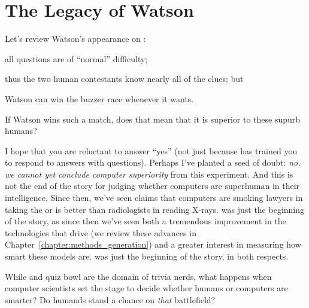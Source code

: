 
\section{The Legacy of Watson}


Let's review Watson's appearance on \jeopardy{}:
\begin{enumerate*}
        \item all questions are of ``normal'' difficulty;
        \item thus the two human contestants know nearly all of the clues; but
        \item Watson can win the buzzer race whenever it wants.
\end{enumerate*}
If Watson wins such a match, does that mean that it is superior to
these supurb humans?

I hope that you are reluctant to answer ``yes'' (not just
because \jeopardy{} has trained you to respond to answers with
questions).
%
Perhaps I've planted a seed of doubt: \emph{no, we cannot yet conclude
  computer superiority} from this experiment.
%
And this is not the end of the story for judging whether computers are
superhuman in their intelligence.
%
Since then, we've seen claims that computers are smoking lawyers in taking the
 or is better than radiologists in reading X-rays.
%
\watson{} was just the beginning of the story, as since then we've seen both a
tremendous improvement in the technologies that drive  (we review
these advances in Chapter~\ref{chapter:methods_generation}) and a greater
interest in measuring how smart these models are.
%
\watson{} was just the beginning of the story, in both respects.


While \jeopardy{} and quiz bowl are the domain of trivia nerds, what
happens when computer scientists set the stage to decide whether
humans or computers are smarter?
%
Do humands stand a chance on \emph{that} battlefield?
